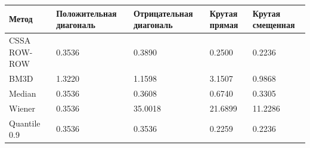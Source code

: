 \begin{tabular}{|l|l|l|l|l|}
\hline
Метод & Положительная диагональ & Отрицательная диагональ & Крутая прямая & Крутая смещенная \\
\hline
CSSA ROW-ROW & 0.3536 & 0.3890 & 0.2500 & 0.2236 \\
\hline
BM3D & 1.3220 & 1.1598 & 3.1507 & 0.9868 \\
\hline
Median & 0.3536 & 0.3608 & 0.6740 & 0.3305 \\
\hline
Wiener & 0.3536 & 35.0018 & 21.6899 & 11.2286 \\
\hline
Quantile 0.9 & 0.3536 & 0.3536 & 0.2259 & 0.2236 \\
\hline
\end{tabular}

